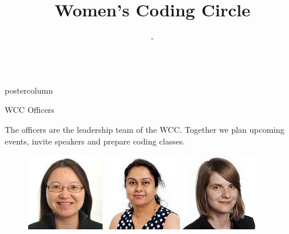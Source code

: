 \documentclass{beamer}
\title{\huge Women's Coding Circle}
\author{-}
\institute{HHMI Janelia Research Campus, Ashburn, USA}
\newlength{\columnheight}
\begin{document}
\begin{frame}
\vspace{-12cm}
\begin{columns}
	\begin{column}{.33\textwidth}
		\begin{beamercolorbox}[center,wd=\textwidth]{postercolumn}
			\begin{minipage}[T]{.95\textwidth}  %
				\parbox[t][\columnheight]{\textwidth}{ %
					\begin{myblock}{WCC Officers}
					    \begin{addmargin}[1em]{1em}
                            The officers are the leadership team of the WCC. Together we plan upcoming events, invite speakers and prepare coding classes.
                        \end{addmargin}
                        \begin{addmargin}[1em]{1em}
                            \vspace{1.5cm}
                            \begin{figure}
                                \centering\includegraphics[width=0.3\textwidth]{img/teri.jpg}
                                \centering\includegraphics[width=0.3\textwidth]{img/kshama.jpg}
                                \centering\includegraphics[width=0.3\textwidth]{img/antje.jpg}

\end{figure}
\end{addmargin}
\end{myblock}}
\end{minipage}
\end{beamercolorbox}
\end{column}
\end{columns}
\end{frame}
\end{document}
